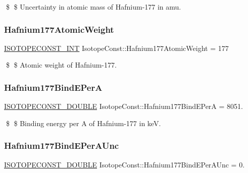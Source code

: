 \$ \$ Uncertainty in atomic mass of Hafnium-\/177 in amu. \mbox{\label{group___isotope_const-_hafnium-_hf177_gaf784e52abf10029447f34501dd7659f0}} 
\subsubsection{\texorpdfstring{Hafnium177\+Atomic\+Weight}{Hafnium177AtomicWeight}}
{\footnotesize\ttfamily \mbox{\hyperlink{group___isotope_const-_macros_ga5f18360b3e99483a35c32d789e62621c}{I\+S\+O\+T\+O\+P\+E\+C\+O\+N\+S\+T\+\_\+\+I\+NT}} Isotope\+Const\+::\+Hafnium177\+Atomic\+Weight = 177}

\$ \$ Atomic weight of Hafnium-\/177. \mbox{\label{group___isotope_const-_hafnium-_hf177_ga0f27e4e0454709c84802233e4cb00a29}} 
\subsubsection{\texorpdfstring{Hafnium177\+Bind\+E\+PerA}{Hafnium177BindEPerA}}
{\footnotesize\ttfamily \mbox{\hyperlink{group___isotope_const-_macros_ga8f45a7272ce02c0b4c65c44636ed719a}{I\+S\+O\+T\+O\+P\+E\+C\+O\+N\+S\+T\+\_\+\+D\+O\+U\+B\+LE}} Isotope\+Const\+::\+Hafnium177\+Bind\+E\+PerA = 8051.}

\$ \$ Binding energy per A of Hafnium-\/177 in keV. \mbox{\label{group___isotope_const-_hafnium-_hf177_ga53746d28e3ee9f2cb587f6bb7d847bd7}} 
\subsubsection{\texorpdfstring{Hafnium177\+Bind\+E\+Per\+A\+Unc}{Hafnium177BindEPerAUnc}}
{\footnotesize\ttfamily \mbox{\hyperlink{group___isotope_const-_macros_ga8f45a7272ce02c0b4c65c44636ed719a}{I\+S\+O\+T\+O\+P\+E\+C\+O\+N\+S\+T\+\_\+\+D\+O\+U\+B\+LE}} Isotope\+Const\+::\+Hafnium177\+Bind\+E\+Per\+A\+Unc = 0.}

